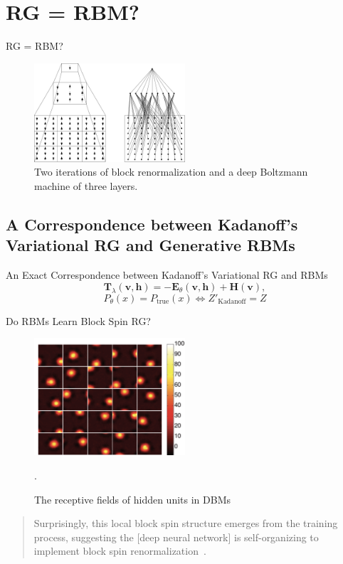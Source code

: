 \documentclass{beamer}
\newcommand{\bolds}[1]{\boldsymbol{#1}}
\newcommand{\bh}{\bolds{h}}
\newcommand{\bv}{\bolds{v}}
\newcommand{\bT}{\bolds{T}}
\renewcommand{\l}{\lambda}
\begin{document}
\section{RG = RBM?}
\begin{frame}{RG = RBM?}
  \begin{figure}[ht]
    \centering
    \includegraphics[width=0.5\textwidth]{figures/rg-rbm.png}
    \caption{Two iterations of block renormalization and a deep
      Boltzmann machine of three layers.\label{fig:rbm-rg} }
  \end{figure}
\end{frame}

%
\subsection{A Correspondence between Kadanoff's Variational RG and
  Generative RBMs}
\begin{frame}{An Exact Correspondence between Kadanoff's Variational
    RG and RBMs}
  \begin{equation*}
    \bT_\l(\bv, \bh)=-\bolds{E}_\theta(\bv,\bh)+\bolds{H}(\bv),
  \end{equation*}
  \begin{equation*}%
    P_\theta(x)=P_{\text{true}}(x)\iff Z'_{\text{Kadanoff}}=Z
  \end{equation*}%
\end{frame}

\begin{frame}{Do RBMs Learn Block Spin RG?}
  \begin{figure}[ht]
    \centering
    \includegraphics[width=0.5\textwidth]{figures/mehta.png}
    \caption{ The receptive fields of hidden units in
      DBMs~\cite{mehta}}.
  \end{figure}
  \begin{quote} Surprisingly, this local block spin structure emerges
    from the training process, suggesting the [deep neural network] is
    self-organizing to implement block spin
    renormalization~\cite{mehta}.
  \end{quote}
\end{frame}
\end{document}
